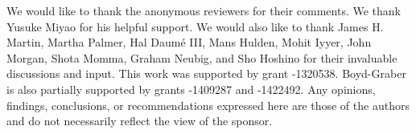 We would like to thank the anonymous reviewers for their comments.  We
thank Yusuke Miyao for his helpful support.  We would also like to
thank James H. Martin, Martha Palmer, Hal {Daum\'e III}, Mans Hulden,
Mohit Iyyer, John Morgan, Shota Momma, Graham Neubig, and Sho Hoshino
for their invaluable discussions and input.  This work was supported
by  grant -1320538.  Boyd-Graber is also partially
supported by  grants -1409287 and
-1422492. Any opinions, findings, conclusions, or
recommendations expressed here are those of the authors and do not
necessarily reflect the view of the sponsor.
